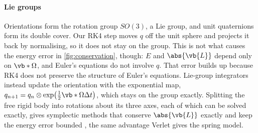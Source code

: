 \paragraph{Lie groups}
Orientations form the rotation group $SO(3)$, a Lie group, and unit quaternions form its double cover.
Our RK4 step moves $q$ off the unit sphere and projects it back by normalising, so it does not stay on the group.
This is not what causes the energy error in \cref{fig:conservation}, though: $E$ and $\abs{\vb{L}}$ depend only on $\vb*{\Omega}$, and Euler's equations do not involve $q$.
That error builds up because RK4 does not preserve the structure of Euler's equations.
Lie-group integrators instead update the orientation with the exponential map, $q_{n+1}=q_n\otimes\exp\!\big(\tfrac12\vb*{\Omega}\Delta t\big)$, which stays on the group exactly.
Splitting the free rigid body into rotations about its three axes, each of which can be solved exactly, gives symplectic methods that conserve $\abs{\vb{L}}$ exactly and keep the energy error bounded \cite{hairer2006}, the same advantage Verlet gives the spring model.

